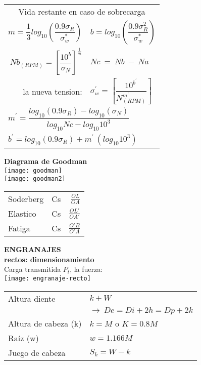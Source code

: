 \documentclass[11pt,a4paper]{article}
\begin{document}
\begin{multicols}{2}
\begin{cajita}
	\begin{tabular}{r l }
		\multicolumn{2}{c}{Vida restante en caso de sobrecarga}\\[0.2cm]
		$m=\dfrac{1}{3}log_{10}\left(\dfrac{0.9\sigma_{R}}{\sigma_{w}^{*}}\right)$&
		$b=log_{10}\left(\dfrac{0.9\sigma_{R}^{2}}{\sigma_{w}^{*}}\right)$\\[0.5cm]
		$Nb_{(RPM)}=\left[\dfrac{10^{b}}{\sigma_{N}}\right]^{\frac{1}{m}}$&$Nc~=~Nb~-~Na$\\
		la nueva tension: & $\sigma_{w}^{'}=\left[\dfrac{10^{b^{'}}}{N_{(RPM)}^{m^{'}}}\right]$\\[0.5cm]
		\multicolumn{2}{l}{$m^{'}=\dfrac{log_{10}(0.9\sigma_{R})-log_{10}(\sigma_{N})}{log_{10}Nc-log_{10}10^{3}}$}\\[0.3cm]
		\multicolumn{2}{l}{$b^{'}=log_{10}(0.9\sigma_{R})+m^{'}~(log_{10}10^{3})$}\\[0.25cm]
		
	\end{tabular}
\newpage
	\textbf{Diagrama de Goodman}\\
\texttt{[image: goodman]}\\
\texttt{[image: goodman2]}\\

\vspace*{0.2cm}
\begin{tabular}{l c r}	
	Soderberg&Cs&$\frac{OL}{OA}$\\[0.2cm]
	Elastico&Cs&$\frac{OL'}{OA'}$\\[0.2cm]
	Fatiga&Cs&$\frac{O'B}{O'A}$\\[0.2cm]
\end{tabular}
	\end{cajita}
	\begin{cajita}
		\textbf{ENGRANAJES}\\
	\textbf{rectos: dimensionamiento}\\
			Carga transmitida $P_t$, la fuerza:\\
			\texttt{[image: engranaje-recto]}\\
			\begin{tabular}{l l}
				Altura diente & $k + W$\\
							&$\rightarrow~De=Di+2h=Dp+2k$\\
				Altura de cabeza (k) & $k= M$ o $K=0.8M$\\
				Raíz (w) & $w=1.166M$\\
				Juego de cabeza& $S_k=W-k$\\
			\end{tabular}\vspace*{0.2cm}



\end{cajita}
\end{multicols}
\end{document}

